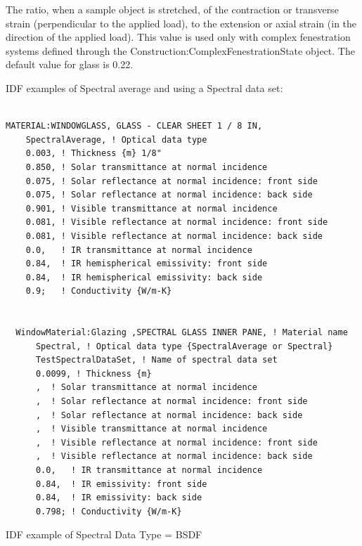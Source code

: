 The ratio, when a sample object is stretched, of the contraction or transverse strain (perpendicular to the applied load), to the extension or axial strain (in the direction of the applied load). This value is used only with complex fenestration systems defined through the Construction:ComplexFenestrationState object. The default value for glass is 0.22.

IDF examples of Spectral average and using a Spectral data set:

\begin{lstlisting}

MATERIAL:WINDOWGLASS, GLASS - CLEAR SHEET 1 / 8 IN,
    SpectralAverage, ! Optical data type
    0.003, ! Thickness {m} 1/8"
    0.850, ! Solar transmittance at normal incidence
    0.075, ! Solar reflectance at normal incidence: front side
    0.075, ! Solar reflectance at normal incidence: back side
    0.901, ! Visible transmittance at normal incidence
    0.081, ! Visible reflectance at normal incidence: front side
    0.081, ! Visible reflectance at normal incidence: back side
    0.0,   ! IR transmittance at normal incidence
    0.84,  ! IR hemispherical emissivity: front side
    0.84,  ! IR hemispherical emissivity: back side
    0.9;   ! Conductivity {W/m-K}


  WindowMaterial:Glazing ,SPECTRAL GLASS INNER PANE, ! Material name
      Spectral, ! Optical data type {SpectralAverage or Spectral}
      TestSpectralDataSet, ! Name of spectral data set
      0.0099, ! Thickness {m}
      ,  ! Solar transmittance at normal incidence
      ,  ! Solar reflectance at normal incidence: front side
      ,  ! Solar reflectance at normal incidence: back side
      ,  ! Visible transmittance at normal incidence
      ,  ! Visible reflectance at normal incidence: front side
      ,  ! Visible reflectance at normal incidence: back side
      0.0,   ! IR transmittance at normal incidence
      0.84,  ! IR emissivity: front side
      0.84,  ! IR emissivity: back side
      0.798; ! Conductivity {W/m-K}
\end{lstlisting}

IDF example of Spectral Data Type = BSDF

